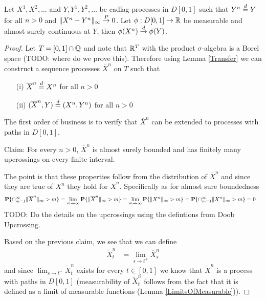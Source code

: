 \begin{lem}\label{ConvergenceAndApproximationCadlag}Let $X^1, X^2, \dotsc$ and $Y,Y^1, Y^2, \dotsc$ be cadlag
  processes in $D[0,1]$ such that $Y^n \overset{d}= Y$ for all $n>0$ and
  $\lVert X^n - Y^n \rVert_\infty \overset{P}\to 0$.  Let $\phi : D[0,1] \to \mathbb{R}$ be
  measurable and almost surely continuous at $Y$, then $\phi(X^n) \overset{d}\to \phi(Y)$.
\end{lem}
\begin{proof}
Let $T = [0,1] \cap \mathbb{Q}$ and note that $\mathbb{R}^T$ with the
product $\sigma$-algebra is a Borel space (TODO: where do we prove this).  Therefore using Lemma \ref{Transfer}
we can construct a sequence processes $\overline{X}^n$ on $T$ such that 
\begin{itemize}
\item[(i)]$\overline{X}^n \overset{d}= X^n$ for all $n >0$
\item[(ii)]$(\overline{X}^n, Y) \overset{d}= (X^n, Y^n)$ for all $n > 0$
\end{itemize}

The first order of business is to verify that $\overline{X}^n$ can be
extended to processes with paths in $D[0,1]$.

Claim: For every $n > 0$, $\overline{X}^n$ is almost surely bounded
and has finitely many upcrossings on every finite interval.

The point is that these properties follow from the distribution of
$\overline{X}^n$ and since they are true of $X^n$ they hold for
$\overline{X}^n$.  Specifically as for almost sure boundedness
\begin{align*}
\textbf{P}\{\cap_{m=1}^\infty \lVert \overline{X}^n \rVert_\infty > m\} &=
\lim_{m \to \infty} \textbf{P}\{\lVert \overline{X}^n \rVert_\infty > m\} =
\lim_{m \to \infty} \textbf{P}\{\lVert X^n \rVert_\infty > m\} =
\textbf{P}\{\cap_{m=1}^\infty \lVert X^n \rVert_\infty > m\} = 0
\end{align*}
TODO: Do the details on the upcrossings using the defintions from Doob
Upcrossing.

Based on the previous claim, we see that we can define
\begin{align*}
\tilde{X}^n_t &= \lim_{s \to t^+} \overline{X}^n_s
\end{align*}
and since $\lim_{s \to t^-} \tilde{X}^n_t$ exists for every $t \in
[0,1]$ we know that $\tilde{X}^n$ is a process with paths in $D[0,1]$ (measurability
of $\tilde{X}^n_t$ follows from the fact that it is defined as a limit
of measurable functions (Lemma \ref{LimitsOfMeasurable})).


\end{proof}
